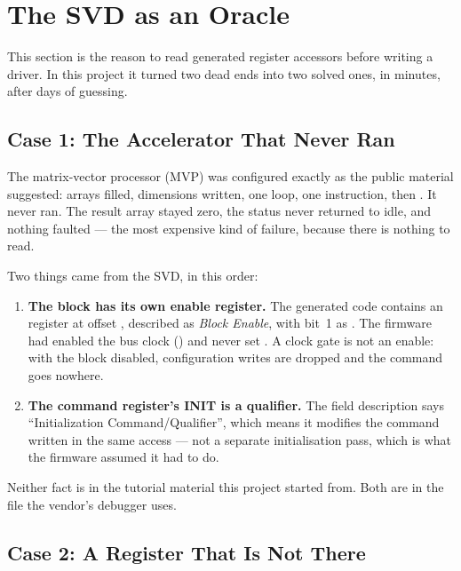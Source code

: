 \section{The SVD as an Oracle}
\label{sec:svd-oracle}

This section is the reason to read generated register accessors before writing a driver. In this
project it turned two dead ends into two solved ones, in minutes, after days of guessing.

\subsection{Case 1: The Accelerator That Never Ran}

The matrix-vector processor (MVP) was configured exactly as the public material suggested: arrays
filled, dimensions written, one loop, one instruction, then . It never ran.
The result array stayed zero, the status never returned to idle, and nothing faulted — the most
expensive kind of failure, because there is nothing to read.

Two things came from the SVD, in this order:

\begin{enumerate}
    \item \textbf{The block has its own enable register.} The generated code contains an
           register at offset , described as \emph{Block Enable}, with
          bit~1 as . The firmware had enabled the bus clock
          () and never set . A clock gate is not an enable:
          with the block disabled, configuration writes are dropped and the command goes nowhere.
    \item \textbf{The command register's INIT is a qualifier.} The field description says
          ``Initialization Command/Qualifier'', which means it modifies the command written in the
          same access — not a separate initialisation pass, which is what the firmware assumed it had
          to do.
\end{enumerate}

Neither fact is in the tutorial material this project started from. Both are in the file the vendor's
debugger uses.

\subsection{Case 2: A Register That Is Not There}

